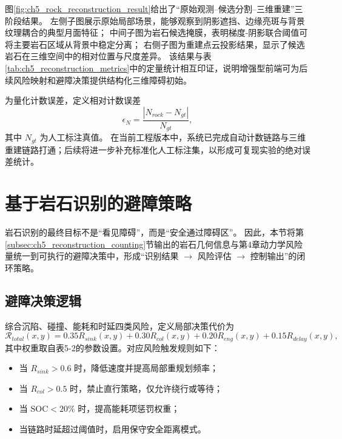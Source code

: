 \documentclass[UTF8,zihao=-4,a4paper,oneside,openany]{ctexrep}
\numberwithin{equation}{chapter}
\theoremstyle{plain}
\theoremstyle{definition}
\newcommand{\abs}[1]{\left| #1 \right|}
\newenvironment{myitemize}{\begin{itemize}[noitemsep,topsep=0pt]}{\end{itemize}}
\begin{document}
图\ref{fig:ch5_rock_reconstruction_result}给出了“原始观测--候选分割--三维重建”三阶段结果。
左侧子图展示原始局部场景，能够观察到阴影遮挡、边缘亮斑与背景纹理耦合的典型月面特征；
中间子图为岩石候选掩膜，表明梯度-阴影联合阈值可将主要岩石区域从背景中稳定分离；
右侧子图为重建点云投影结果，显示了候选岩石在三维空间中的相对位置与尺度差异。
该结果与表\ref{tab:ch5_reconstruction_metrics}中的定量统计相互印证，说明增强型前端可为后续风险映射和避障决策提供结构化三维障碍初始。

为量化计数误差，定义相对计数误差
\begin{equation}
\epsilon_N=\frac{\abs{N_{rock}-N_{gt}}}{N_{gt}},
\label{eq:ch5_count_error}
\end{equation}
其中 $N_{gt}$ 为人工标注真值。
在当前工程版本中，系统已完成自动计数链路与三维重建链路打通；后续将进一步补充标准化人工标注集，以形成可复现实验的绝对误差统计。

\section{基于岩石识别的避障策略}
\label{sec:ch5_obstacle_avoidance}

岩石识别的最终目标不是“看见障碍”，而是“安全通过障碍区”。
因此，本节将第\ref{subsec:ch5_reconstruction_counting}节输出的岩石几何信息与第4章动力学风险量统一到可执行的避障决策中，形成“识别结果 $\rightarrow$ 风险评估 $\rightarrow$ 控制输出”的闭环策略。

\subsection{避障决策逻辑}
\label{subsec:ch5_decision_logic}

综合沉陷、碰撞、能耗和时延四类风险，定义局部决策代价为
\begin{equation}
\mathcal{R}_{total}(x,y)=0.35R_{sink}(x,y)+0.30R_{col}(x,y)+0.20R_{eng}(x,y)+0.15R_{delay}(x,y),
\label{eq:ch5_total_risk}
\end{equation}
其中权重取自表5-2的参数设置。对应风险触发规则如下：
\begin{myitemize}
	\item 当 $R_{sink}>0.6$ 时，降低速度并提高局部重规划频率；
	\item 当 $R_{col}>0.5$ 时，禁止直行策略，仅允许绕行或等待；
	\item 当 $\mathrm{SOC}<20\%$ 时，提高能耗项惩罚权重；
	\item 当链路时延超过阈值时，启用保守安全距离模式。
\end{myitemize}
\end{document}
